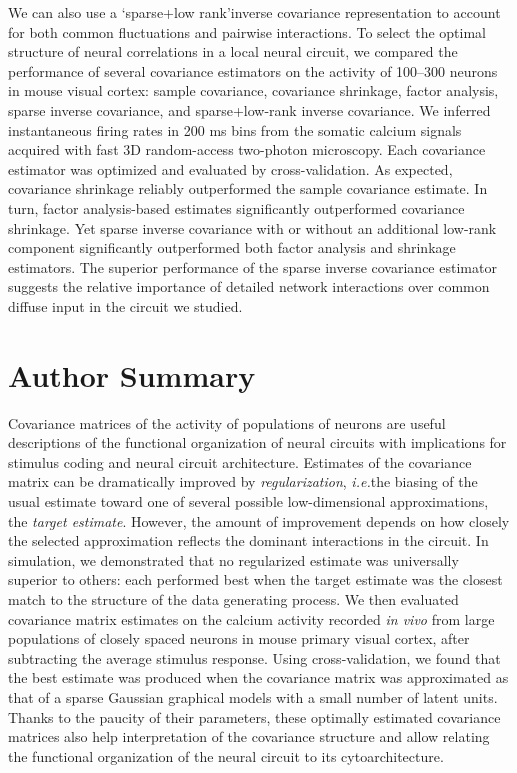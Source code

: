 \documentclass[10pt]{article}
\begin{document}
We can also use a \lq sparse+low rank\rq inverse covariance representation to account for both common fluctuations and pairwise interactions.  
To select the optimal structure of neural correlations in a local neural circuit, we compared the performance of several covariance estimators on the activity of 100--300 neurons in mouse visual cortex: sample covariance, covariance shrinkage, factor analysis, sparse inverse covariance, and sparse+low-rank inverse covariance. We inferred instantaneous firing rates in 200 ms bins from the somatic calcium signals acquired with fast 3D random-access two-photon microscopy.  Each covariance estimator was optimized and evaluated by cross-validation. As expected, covariance shrinkage reliably outperformed the sample covariance estimate. In turn, factor analysis-based estimates significantly outperformed covariance shrinkage. Yet sparse inverse covariance with or without an additional low-rank component significantly outperformed both factor analysis and shrinkage estimators. The superior performance of the sparse inverse covariance estimator suggests the relative importance of detailed network interactions over common diffuse input in the circuit we studied.

\section*{Author Summary}
Covariance matrices of the activity of populations of neurons are useful descriptions of the functional organization of neural circuits with implications for stimulus coding and neural circuit architecture. 
Estimates of the covariance matrix can be dramatically improved by \emph{regularization}, \emph{i.e.}\;the biasing of the usual estimate toward one of several possible low-dimensional approximations, the \emph{target estimate}. However, the amount of improvement depends on how closely the selected approximation reflects the dominant interactions in the circuit. 
In simulation, we demonstrated that no regularized estimate was universally superior to others: each performed best when the target estimate was the closest match to the structure of the data generating process. 
We then evaluated covariance matrix estimates on the calcium activity recorded \emph{in vivo} from large populations of closely spaced neurons  in mouse primary visual cortex, after subtracting the average stimulus response.
Using cross-validation, we found that the best estimate was produced when the covariance matrix was approximated as that of a sparse Gaussian graphical models with a small number of latent units. 
Thanks to the paucity of their parameters, these optimally estimated covariance matrices also help interpretation of the covariance structure and allow relating the functional organization of the neural circuit to its cytoarchitecture.
\end{document}
